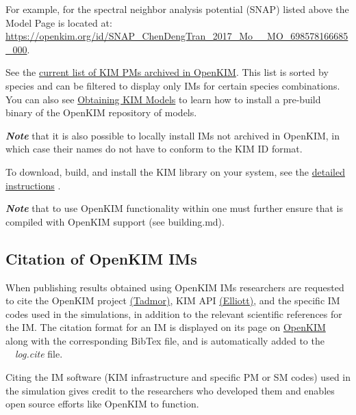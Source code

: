 For example, for the spectral neighbor analysis potential (SNAP) listed above the
Model Page is located at: \\
\href{https://openkim.org/id/SNAP_ChenDengTran_2017_Mo__MO_698578166685_000}
{https://openkim.org/id/SNAP\_ChenDengTran\_2017\_Mo\_\_MO\_698578166685\_000}.

See the \href{https://openkim.org/browse/models/by-species}{current list
of KIM PMs archived in OpenKIM}. This list is sorted by species
and can be filtered to display only IMs for certain species combinations. You can also
see \href{https://openkim.org/doc/usage/obtaining-models/}
{Obtaining KIM Models} to learn how to install a pre-build binary of the OpenKIM
repository of models.

\emph{{\bf Note}}  that it is also possible to locally install IMs not archived in OpenKIM,
in which case their names do not have to conform to the KIM ID format.

To download, build, and install the KIM library on your system, see the
\href{https://openkim.org/doc/usage/obtaining-models/}{detailed instructions}
.

\emph{{\bf Note}} that to use OpenKIM functionality within \D one must further ensure
that \D is compiled with OpenKIM support (see building.md).

\subsection*{Citation of OpenKIM IMs}
When publishing results obtained using OpenKIM IMs researchers are requested to
cite the OpenKIM project
\href{https://link.springer.com/article/10.1007%2Fs11837-011-0102-6}
{(Tadmor)}, KIM API
\href{https://doi.org/10.25950/FF8F563A}{(Elliott)}, and the specific
IM codes used in the simulations, in addition to the relevant scientific references
for the IM. The citation format for an IM is displayed on its page on
\href{https://openkim.org/}{OpenKIM}
along with the corresponding BibTex file, and is automatically added to
the \D ~~{\em log.cite} file.

Citing the IM software (KIM infrastructure and specific PM or SM codes) used
in the simulation gives credit to the researchers who developed them and
enables open source efforts like OpenKIM to function.
